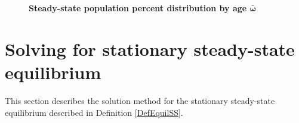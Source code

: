 \documentclass[letterpaper,12pt]{article}
\theoremstyle{definition}
\renewcommand\theenumi{\roman{enumi}}
\begin{document}
  \begin{figure}[htbp]\centering \captionsetup{width=4.0in}
    \caption{\label{FigSSpopdist}\textbf{Steady-state population percent distribution by age $\bm{\bar{\omega}}$}}
  \end{figure}
  \clearpage


\newpage
\section{Solving for stationary steady-state equilibrium}\label{AppSSsolve}

  \setcounter{equation}{0}
  \renewcommand\theenumi{\arabic{enumi}}
  \renewcommand\theenumii{\alph{enumii}}
  \renewcommand\theenumiii{\roman{enumiii}}

  This section describes the solution method for the stationary steady-state equilibrium described in Definition \ref{DefEquilSS}.
\end{document}
